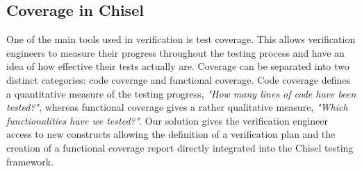\documentclass[conference]{IEEEtran}
\newcommand{\martin}[1]{{\color{blue} Martin: #1}}
\begin{document}
\subsection{Coverage in Chisel}


One of the main tools used in verification is test coverage. This allows verification engineers to measure their progress throughout the testing process and have an idea of how effective their tests actually are. Coverage can be separated into two distinct categories: code coverage and functional coverage. Code coverage defines a quantitative measure of the testing progress, \textit{"How many lines of code have been tested?"}, whereas functional coverage gives a rather qualitative measure, \textit{"Which functionalities have we tested?"}.  Our solution gives the verification engineer access to new constructs allowing the definition of a verification plan and the creation of a functional coverage report directly integrated into the Chisel testing framework.
\end{document}
